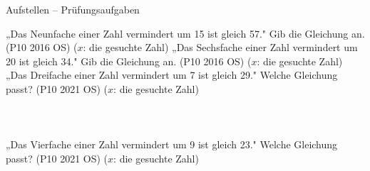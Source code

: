 \begin{aufgabe}{Aufstellen – Prüfungsaufgaben}
\begin{teile}
\teil „Das Neunfache einer Zahl vermindert um 15 ist gleich 57." Gib die Gleichung an. \hfill (P10 2016 OS) ($x$: die gesuchte Zahl)
\teil „Das Sechsfache einer Zahl vermindert um 20 ist gleich 34." Gib die Gleichung an. \hfill (P10 2016 OS) ($x$: die gesuchte Zahl)
\teil „Das Dreifache einer Zahl vermindert um 7 ist gleich 29." Welche Gleichung passt? \hfill (P10 2021 OS) ($x$: die gesuchte Zahl) \\  \\  \\  \\ 
\teil „Das Vierfache einer Zahl vermindert um 9 ist gleich 23." Welche Gleichung passt? \hfill (P10 2021 OS) ($x$: die gesuchte Zahl) \\  \\  \\  \\ 
\end{teile}
\end{aufgabe}
